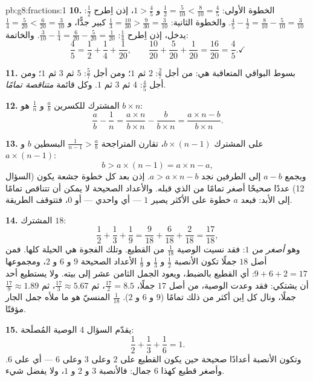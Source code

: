 \begin{solution}{pb:g8:fractions:1}
\textbf{10.} الخطوة الأولى: $\frac12 = \frac{5}{10} < \frac{8}{10} =
\frac45$ و $1 > \frac45$، إذن اِطرح $\frac12$:
$\frac45 - \frac12 = \frac{8}{10} - \frac{5}{10} = \frac{3}{10}$.
والخطوة الثانية: $\frac13 = \frac{10}{30} > \frac{9}{30} =
\frac{3}{10}$ كبير جدًّا، و $\frac14 = \frac{5}{20} <
\frac{6}{20} = \frac{3}{10}$ يدخل، إذن اِطرح $\frac14$:
$\frac{3}{10} - \frac14 = \frac{6}{20} - \frac{5}{20} =
\frac{1}{20}$. والخاتمة:
\[
\frac45 = \frac12 + \frac14 + \frac{1}{20},
\qquad
\frac{10}{20} + \frac{5}{20} + \frac{1}{20} = \frac{16}{20}
= \frac45 . \checkmark
\]

\textbf{11.} بسوط البواقي المتعاقبة هي:
من أجل $\frac27$: $2$ ثم $1$؛ ومن أجل $\frac57$: $5$ ثم $3$ ثم
$1$؛ ومن أجل $\frac45$: $4$ ثم $3$ ثم $1$. وكل قائمة
\emph{متناقصة تمامًا}.

\textbf{12.}  المشترك للكسرين $\frac ab$ و $\frac1n$
هو $b \times n$:
\[
\frac{a}{b} - \frac{1}{n}
= \frac{a \times n}{b \times n} - \frac{b}{b \times n}
= \frac{a \times n - b}{b \times n} .
\]

\textbf{13.} على  المشترك $b \times (n-1)$، تقارن
المتراجحة $\frac{1}{n-1} > \frac ab$ البسطين
$b$ و $a \times (n - 1)$:
\[
b > a \times (n - 1) = a \times n - a ,
\]
وبجمع $a - b$ إلى الطرفين نجد $a > a \times n - b$. إذن
بعد كل خطوة جشعة يكون   (السؤال
12) عددًا صحيحًا أصغر تمامًا من الذي قبله. والأعداد
الصحيحة لا يمكن أن تتناقص تمامًا إلى الأبد: فبعد $a$ خطوة على الأكثر
يصير   $1$ --- أي  واحدي --- أو
$0$، فتتوقف الطريقة.

\textbf{14.}  المشترك $18$:
\[
\frac12 + \frac13 + \frac19
= \frac{9}{18} + \frac{6}{18} + \frac{2}{18}
= \frac{17}{18} ,
\]
وهو \emph{أصغر من} $1$: فقد نسيت الوصية $\frac{1}{18}$ من
القطيع. وتلك الفجوة هي الحيلة كلها. فمن أصل $18$ جملًا تكون
الأنصبة $\frac12$ و $\frac13$ و $\frac19$ الأعداد الصحيحة $9$
و $6$ و $2$، ومجموعها $9 + 6 + 2 = 17$: أي القطيع بالضبط،
ويعود الجمل الثامن عشر إلى بيته. ولا يستطيع أحد أن يشتكي:
فقد وعدت الوصية، من أصل $17$ جملًا، $\frac{17}{2} = 8.5$، ثم
$\frac{17}{3} \approx 5.67$، ثم $\frac{17}{9} \approx 1.89$
جملًا، ونال كل اِبن أكثر من ذلك تمامًا ($9$ و $6$ و $2$).
 $\frac{1}{18}$ المنسيّ هو ما ملأه جمل الجار
مؤقتًا.

\textbf{15.} يقدّم السؤال 4 الوصية المُصلَحة:
\[
\frac12 + \frac13 + \frac16 = 1 .
\]
وتكون الأنصبة أعدادًا صحيحة حين يكون  القطيع  على
$2$ وعلى $3$ وعلى $6$ --- أي  على $6$. وأصغر
قطيع كهذا $6$ جمال: فالأنصبة $3$ و $2$ و $1$، ولا يفضل
شيء.
\end{solution}
